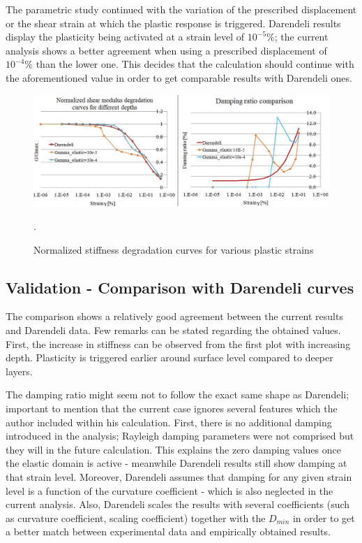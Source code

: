 \documentclass[12pt,a4paper]{report}
\begin{document}
The parametric study continued with the variation of the prescribed displacement or the shear strain at which the plastic response is triggered. Darendeli results display the plasticity being activated at a strain level of $10^{-5}\%$; the current analysis shows a better agreement when using a prescribed displacement of $10^{-4}\%$ than the lower one. This decides that the calculation should continue with the aforementioned value in order to get comparable results with Darendeli ones.

\begin{figure}[h!]
	\centering
	\includegraphics[width=1\linewidth]{"ggmax2"}
	\caption{Normalized stiffness degradation curves for various plastic strains}
	\label{ggmax}.
\end{figure}

\subsection{Validation - Comparison with Darendeli curves}
The comparison shows a relatively good agreement between the current results and Darendeli data. Few remarks can be stated regarding the obtained values. First, the increase in stiffness can be observed from the first plot with increasing depth. Plasticity is triggered earlier around surface level compared to deeper layers. 

The damping ratio might seem not to follow the exact same shape as Darendeli; important to mention that the current case ignores several features which the author included within his calculation. First, there is no additional damping introduced in the analysis; Rayleigh damping parameters were not comprised but they will in the future calculation. This explains the zero damping values once the elastic domain is active - meanwhile Darendeli results still show damping at that strain level. Moreover, Darendeli assumes that damping for any given strain level is a function of the curvature coefficient - which is also neglected in the current analysis. Also, Darendeli scales the results with several coefficients (such as curvature coefficient, scaling coefficient) together with the $D_{min}$ in order to get a better match between experimental data and empirically obtained results. 
\end{document}
